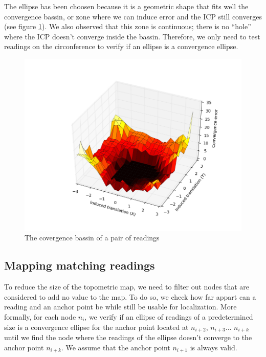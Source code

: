 \documentclass[letterpaper,10 pt,conference]{ieeeconf}
\begin{document}
The ellipse has been choosen because it is a geometric shape that fits well the convergence bassin,
or zone where we can induce error and the ICP still converges (see figure
\ref{convergence_bassin}). We also observed that this zone is continuous; there is no ``hole'' where
the ICP doesn't converge inside the bassin.  Therefore, we only need to test readings on the
circonference to verify if an ellipse is a convergence ellipse.

\begin{figure}[thpb]
  \centering
  \includegraphics[scale=0.4]{convergence_bassin}
  \caption{The covergence bassin of a pair of readings}
  \label{convergence_bassin}
\end{figure}

\subsection{Mapping matching readings}
\label{matching-readings}
To reduce the size of the topometric map, we need to filter out nodes that are considered to add no
value to the map. To do so, we check how far appart can a reading and an anchor point be while still
be usable for localization. More formally, for each node $n_i$, we verify if an ellipse of readings
of a predetermined size is a convergence ellipse for the anchor point located at $n_{i+2}$,
$n_{i+3}$... $n_{i+k}$ until we find the node where the readings of the ellipse doesn't converge to
the anchor point $n_{i+k}$. We assume that the anchor point $n_{i+1}$ is always valid.
\end{document}
